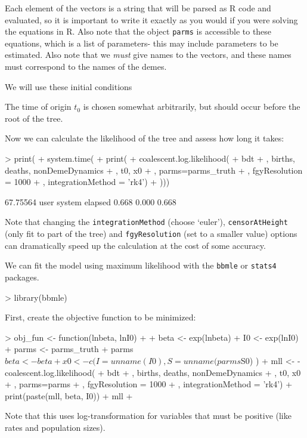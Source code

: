 \documentclass{article}
\begin{document}
Each element of the vectors is a string that will be parsed as R code and evaluated, so it is important to write it exactly as you would if you were solving the equations in R.
Also note that the object \texttt{parms} is accessible to these equations, which is a list of parameters- this may include parameters to be estimated.
Also note that we \emph{must} give names to the vectors, and these names must correspond to the names of the demes. 

We will use these initial conditions
\begin{Schunk}
\end{Schunk}
The time of origin $t_0$ is chosen somewhat arbitrarily, but should occur before the root of the tree. 

Now we can calculate the likelihood of the tree and assess how long it takes:
\begin{Schunk}
\begin{Sinput}
> print( 
+ system.time( 
+ print(
+   coalescent.log.likelihood(
+     bdt
+     , births, deaths, nonDemeDynamics
+     , t0, x0
+     , parms=parms_truth
+     , fgyResolution = 1000
+     , integrationMethod = 'rk4')
+ )))
\end{Sinput}
\begin{Soutput}
[1] 67.75564
   user  system elapsed 
  0.668   0.000   0.668 
\end{Soutput}
\end{Schunk}
Note that changing the \texttt{integrationMethod} (choose `euler'), \texttt{censorAtHeight} (only fit to part of the tree) and \texttt{fgyResolution} (set to a smaller value) options can dramatically speed up the calculation at the cost of some accuracy. 

We can fit the model using maximum likelihood with the \texttt{bbmle} or \texttt{stats4} packages. 
\begin{Schunk}
\begin{Sinput}
> 	library(bbmle)
\end{Sinput}
\end{Schunk}
First, create the objective function to be minimized:
\begin{Schunk}
\begin{Sinput}
> obj_fun <- function(lnbeta, lnI0)
+ {
+ 	beta <- exp(lnbeta)
+ 	I0 <- exp(lnI0)
+ 	parms <- parms_truth
+ 	parms$beta <- beta
+ 	x0 <- c(I=unname(I0), S = unname(parms$S0) )
+ 	mll <- -coalescent.log.likelihood(
+ 		bdt
+ 		, births, deaths, nonDemeDynamics
+ 		,  t0, x0
+ 		, parms=parms
+ 		, fgyResolution = 1000
+ 		, integrationMethod = 'rk4')
+ 	print(paste(mll, beta, I0))
+ 	mll
+ }
\end{Sinput}
\end{Schunk}
Note that this uses log-transformation for variables that must be positive (like rates and population sizes).
\end{document}
